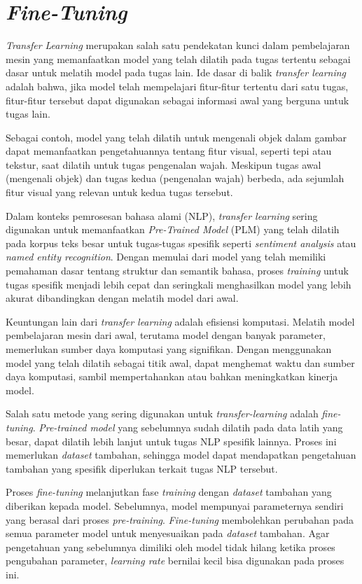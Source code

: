 \section{\textit{Fine-Tuning}}

\textit{Transfer Learning} merupakan salah satu pendekatan kunci dalam pembelajaran mesin yang memanfaatkan model yang telah dilatih pada tugas tertentu sebagai dasar untuk melatih model pada tugas lain. Ide dasar di balik \textit{transfer learning} adalah bahwa, jika model telah mempelajari fitur-fitur tertentu dari satu tugas, fitur-fitur tersebut dapat digunakan sebagai informasi awal yang berguna untuk tugas lain.

Sebagai contoh, model yang telah dilatih untuk mengenali objek dalam gambar dapat memanfaatkan pengetahuannya tentang fitur visual, seperti tepi atau tekstur, saat dilatih untuk tugas pengenalan wajah. Meskipun tugas awal (mengenali objek) dan tugas kedua (pengenalan wajah) berbeda, ada sejumlah fitur visual yang relevan untuk kedua tugas tersebut.

Dalam konteks pemrosesan bahasa alami (NLP), \textit{transfer learning} sering digunakan untuk memanfaatkan \textit{Pre-Trained Model} (PLM) yang telah dilatih pada korpus teks besar untuk tugas-tugas spesifik seperti \textit{sentiment analysis} atau \textit{named entity recognition}. Dengan memulai dari model yang telah memiliki pemahaman dasar tentang struktur dan semantik bahasa, proses \textit{training} untuk tugas spesifik menjadi lebih cepat dan seringkali menghasilkan model yang lebih akurat dibandingkan dengan melatih model dari awal.

Keuntungan lain dari \textit{transfer learning} adalah efisiensi komputasi. Melatih model pembelajaran mesin dari awal, terutama model dengan banyak parameter, memerlukan sumber daya komputasi yang signifikan. Dengan menggunakan model yang telah dilatih sebagai titik awal, dapat menghemat waktu dan sumber daya komputasi, sambil mempertahankan atau bahkan meningkatkan kinerja model.

Salah satu metode yang sering digunakan untuk \textit{transfer-learning} adalah \textit{fine-tuning}. \textit{Pre-trained model} yang sebelumnya sudah dilatih pada data latih yang besar, dapat dilatih lebih lanjut untuk tugas NLP spesifik lainnya. Proses ini memerlukan \textit{dataset} tambahan, sehingga model dapat mendapatkan pengetahuan tambahan yang spesifik diperlukan terkait tugas NLP tersebut.

Proses \textit{fine-tuning} melanjutkan fase \textit{training} dengan \textit{dataset} tambahan yang diberikan kepada model. Sebelumnya, model mempunyai parameternya sendiri yang berasal dari proses \textit{pre-training}. \textit{Fine-tuning} membolehkan perubahan pada semua parameter model untuk menyesuaikan pada \textit{dataset} tambahan. Agar pengetahuan yang sebelumnya dimiliki oleh model tidak hilang ketika proses pengubahan parameter, \textit{learning rate} bernilai kecil bisa digunakan pada proses ini.

